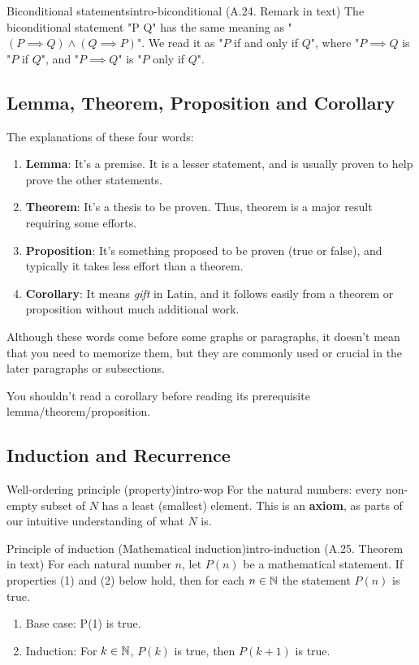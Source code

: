 \documentclass[../src/handouts/main.tex]{subfiles}
\begin{document}
\begin{remark}{Biconditional statements}{intro-biconditional}
  (A.24. Remark in text)
  The biconditional statement "P \iff Q" has the same meaning as "$(P \implies Q) \land (Q \implies P)$". We read it as "$P$ if and only if $Q$", where "$P \implies Q$ is "$P$ if $Q$", and "$P \implies Q$" is "$P$ only if $Q$".
\end{remark}

\subsection{Lemma, Theorem, Proposition and Corollary}

The explanations of these four words:
\begin{enumerate}
  \item \textbf{Lemma}: It's a premise. It is a lesser statement, and is usually proven to help prove the other statements.
  \item \textbf{Theorem}: It's a thesis to be proven. Thus, theorem is a major result requiring some efforts.
  \item \textbf{Proposition}: It's something proposed to be proven (true or false), and typically it takes less effort than a theorem.
  \item \textbf{Corollary}: It means \textit{gift} in Latin, and it follows easily from a theorem or proposition without much additional work.
\end{enumerate}

Although these words come before some graphs or paragraphs, it doesn't mean that you need to memorize them, but they are commonly used or crucial in the later paragraphs or subsections.

You shouldn't read a corollary before reading its prerequisite lemma/theorem/proposition.

\subsection{Induction and Recurrence}

\begin{principle}{Well-ordering principle (property)}{intro-wop}
  For the natural numbers: every non-empty subset of $N$ has a least (smallest) element.
  This is an \textbf{axiom}, as parts of our intuitive understanding of what $N$ is.
\end{principle}

\begin{principle}{Principle of induction (Mathematical induction)}{intro-induction}
  (A.25. Theorem in text)
  For each natural number $n$, let $P(n)$ be a mathematical statement.
  If properties (1) and (2) below hold, then for each $n \in \mathbb{N}$ the statement $P(n)$ is true.
  \begin{enumerate}
    \item Base case: P(1) is true.
    \item Induction: For $k \in \mathbb{N}$, $P(k)$ is true, then $P(k + 1)$ is true.
  \end{enumerate}
\end{principle}
\end{document}
